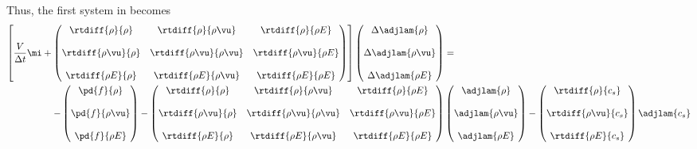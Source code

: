 Thus, the first system in  becomes
\begin{equation}
  \begin{split}
    \left[
      \frac{V}{\Delta t} \mi +
      \begin{pmatrix}
        \rtdiff{\rho}{\rho} & \rtdiff{\rho}{\rho \vu} & \rtdiff{\rho}{\rho E} \\ \\
        \rtdiff{\rho \vu}{\rho} & \rtdiff{\rho \vu}{\rho \vu} & \rtdiff{\rho \vu}{\rho E} \\ \\
        \rtdiff{\rho E}{\rho} & \rtdiff{\rho E}{\rho \vu} & \rtdiff{\rho E}{\rho E}
      \end{pmatrix}
    \right]
    \begin{pmatrix}
      \Delta \adjlam{\rho} \\ \\
      \Delta \adjlam{\rho \vu} \\ \\
      \Delta \adjlam{\rho E}
    \end{pmatrix}
    &= \\ -
    \begin{pmatrix}
      \pd{f}{\rho} \\ \\
      \pd{f}{\rho \vu} \\ \\
      \pd{f}{\rho E}
    \end{pmatrix}
    -
    \begin{pmatrix}
      \rtdiff{\rho}{\rho} & \rtdiff{\rho}{\rho \vu} & \rtdiff{\rho}{\rho E} \\ \\
      \rtdiff{\rho \vu}{\rho} & \rtdiff{\rho \vu}{\rho \vu} & \rtdiff{\rho \vu}{\rho E} \\ \\
      \rtdiff{\rho E}{\rho} & \rtdiff{\rho E}{\rho \vu} & \rtdiff{\rho E}{\rho E}
    \end{pmatrix}
    &
    \begin{pmatrix}
      \adjlam{\rho} \\ \\
      \adjlam{\rho \vu} \\ \\
      \adjlam{\rho E}
    \end{pmatrix}
    -
    \begin{pmatrix}
      \rtdiff{\rho}{c_s} \\ \\
      \rtdiff{\rho \vu}{c_s} \\ \\
      \rtdiff{\rho E}{c_s}
    \end{pmatrix}
    \adjlam{c_s}
  \end{split}
  \label{adj-dc-time1}
\end{equation}
